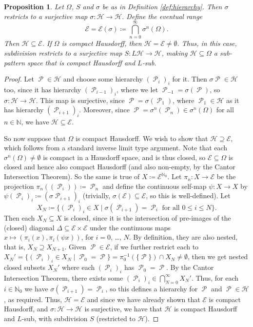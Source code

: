 \documentclass[11pt]{amsart}
\numberwithin{equation}{section}
\theoremstyle{plain}
\newtheorem{proposition}[theorem]{Proposition}
\theoremstyle{definition}
\newcommand{\N}{\mathbb N}
\newcommand{\sH}{\mathscr{H}}
\newcommand{\sub}{\sigma}
\DeclareMathOperator{\cP}{\mathcal{P}}
\begin{document}
\begin{proposition}\label{prop:restriction to hierarchical elements}
Let \(\Omega\), \(S\) and \(\sub\) be as in Definition \ref{def:hierarchy}. Then \(\sub\) restricts to a surjective map \(\sub \colon \sH \to \sH\). Define the eventual range
\[
\mathscr{E} = \mathscr{E}(\sub) \coloneqq \bigcap_{n=0}^\infty \sub^n(\Omega) .
\]
Then \(\sH \subseteq \mathscr{E}\). If \(\Omega\) is compact Hausdorff, then \(\sH = \mathscr{E} \neq \emptyset\). Thus, in this case, subdivision restricts to a surjective map \(S \colon L \mathscr{H} \to \mathscr{H}\), making \(\mathscr{H} \subseteq \Omega\) a sub-pattern space that is compact Hausdorff and \(L\)-sub.
\end{proposition}

\begin{proof}
Let \(\cP \in \sH\) and choose some hierarchy \((\cP_i)_i\) for it. Then \(\sub \cP \in \sH\) too, since it has hierarchy \((\cP_{i-1})_i\), where we let \(\cP_{-1} = \sub(\cP)\), so \(\sub \colon \sH \to \sH\). This map is surjective, since \(\cP = \sub(\cP_1)\), where \(\cP_1 \in \sH\) as it has hierarchy \((\cP_{i+1})_i\). Moreover, since \(\cP = \sub^n(\cP_n) \in \sub^n(\Omega)\) for all \(n \in \N\), we have \(\sH \subseteq \mathscr{E}\).

So now suppose that \(\Omega\) is compact Hausdorff. We wish to show that \(\mathscr{H} \supseteq \mathscr{E}\), which follows from a standard inverse limit type argument. Note that each \(\sub^n(\Omega) \neq \emptyset\) is compact in a Hausdorff space, and is thus closed, so \(\mathscr{E} \subseteq \Omega\) is closed and hence also compact Hausdorff (and also non-empty, by the Cantor Intersection Theorem). So the same is true of \(X \coloneqq \mathscr{E}^{\N_0}\). Let \(\pi_n \colon X \to \mathscr{E}\) be the projection \(\pi_n((\cP_i)) \coloneqq \cP_n\) and define the continuous self-map \(\psi \colon X \to X\) by \(\psi(\cP_i)_i \coloneqq (\sub \cP_{i+1})_i\) (trivially, \(\sub(\mathscr{E}) \subseteq \mathscr{E}\), so this is well-defined). Let
\[
X_N \coloneqq \{(\cP_i)_i \in X \mid \sub(\cP_{i+1}) = \cP_i \text{ for all } 0 \leq i \leq N \} .
\]
Then each \(X_N \subseteq X\) is closed, since it is the intersection of pre-images of the (closed) diagonal \(\Delta \subseteq \mathscr{E} \times \mathscr{E}\) under the continuous maps \(x \mapsto (\pi_i (x), \pi_i(\psi x))\), for \(i = 0\), \ldots, \(N\). By definition, they are also nested, that is, \(X_N \supseteq X_{N+1}\). Given \(\cP \in \mathscr{E}\), if we further restrict each to \(X_N' = \{(\cP_i)_i \in X_N \mid \cP_0 = \cP\} = \pi_0^{-1}(\{\cP\}) \cap X_N \neq \emptyset\), then we get nested closed subsets \(X_N'\) where each \((\cP_i)_i\) has \(\cP_0 = \cP\). By the Cantor Intersection Theorem, there exists some \((\cP_i)_i \in \bigcap_{N=0}^\infty X_N'\). Thus, for each \(i \in \N_0\) we have \(\sub(\cP_{i+1}) = \cP_i\), so this defines a hierarchy for \(\cP\) and \(\cP \in \sH\), as required. Thus, \(\sH = \mathscr{E}\) and since we have already shown that \(\mathscr{E}\) is compact Hausdorff, and \(\sub \colon \sH \to \sH\) is surjective, we have that \(\sH\) is compact Hausdorff and \(L\)-sub, with subdivision \(S\) (restricted to \(\sH\)).
\end{proof}
\end{document}
